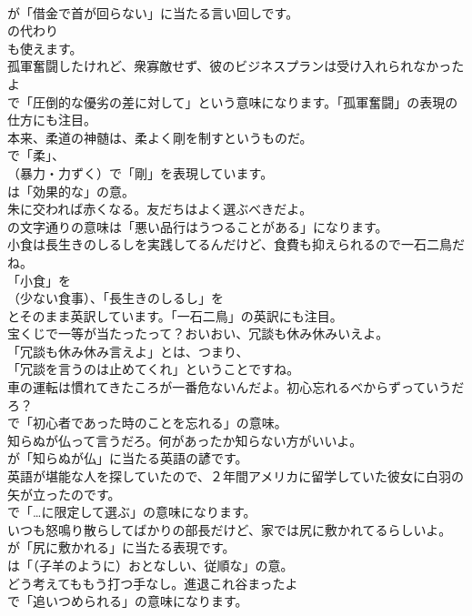 \documentclass[8pt]{extreport}
\begin{document}
\begin{CJK}{UTF8}{min}
\\	が「借金で首が回らない」に当たる言い回しです。
\\	の代わり
\\	も使えます。	
\\	孤軍奮闘したけれど、衆寡敵せず、彼のビジネスプランは受け入れられなかったよ 
\\	で「圧倒的な優劣の差に対して」という意味になります。「孤軍奮闘」の表現の仕方にも注目。	
\\	本来、柔道の神髄は、柔よく剛を制すというものだ。 
\\	で「柔」、
\\	（暴力・力ずく）で「剛」を表現しています。
\\	は「効果的な」の意。	
\\	朱に交われば赤くなる。友だちはよく選ぶべきだよ。 
\\	の文字通りの意味は「悪い品行はうつることがある」になります。	
\\	小食は長生きのしるしを実践してるんだけど、食費も抑えられるので一石二鳥だね。 
\\	「小食」を
\\	（少ない食事）、「長生きのしるし」を
\\	とそのまま英訳しています。「一石二鳥」の英訳にも注目。	
\\	宝くじで一等が当たったって？おいおい、冗談も休み休みいえよ。 
\\	「冗談も休み休み言えよ」とは、つまり、
\\	「冗談を言うのは止めてくれ」ということですね。	
\\	車の運転は慣れてきたころが一番危ないんだよ。初心忘れるべからずっていうだろ？ 
\\	で「初心者であった時のことを忘れる」の意味。	
\\	知らぬが仏って言うだろ。何があったか知らない方がいいよ。 
\\	が「知らぬが仏」に当たる英語の諺です。	
\\	英語が堪能な人を探していたので、２年間アメリカに留学していた彼女に白羽の矢が立ったのです。 
\\	で「…に限定して選ぶ」の意味になります。	
\\	いつも怒鳴り散らしてばかりの部長だけど、家では尻に敷かれてるらしいよ。 
\\	が「尻に敷かれる」に当たる表現です。
\\	は「（子羊のように）おとなしい、従順な」の意。	
\\	どう考えてももう打つ手なし。進退これ谷まったよ 
\\	で「追いつめられる」の意味になります。	

\end{CJK}
\end{document}
